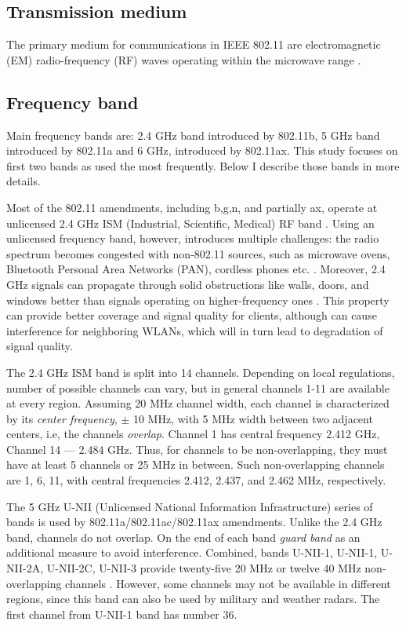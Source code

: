 \subsection{Transmission medium}

The primary medium for communications in IEEE 802.11 are electromagnetic (EM) radio-frequency (RF) waves operating within the microwave range \cite{colemanCWNACertifiedWireless2021}.

\subsection{Frequency band}
Main frequency bands are: 2.4 GHz band introduced by 802.11b, 5 GHz band introduced by 802.11a and 6 GHz, introduced by 802.11ax. This study focuses on first two bands as used the most frequently. Below I describe those bands in more details.

Most of the 802.11 amendments, including b,g,n, and partially ax, operate at unlicensed 2.4 GHz ISM (Industrial, Scientific, Medical) RF band \cite{tanenbaumComputerNetworks2020, colemanCWNACertifiedWireless2021}. Using an unlicensed frequency band, however, introduces multiple challenges: the radio spectrum becomes congested with non-802.11 sources, such as microwave ovens, Bluetooth Personal Area Networks (PAN), cordless phones etc. \cite{tanenbaumComputerNetworks2020, colemanCWNACertifiedWireless2021}. Moreover, 2.4 GHz signals can propagate through solid obstructions like walls, doors, and windows better than signals operating on higher-frequency ones \cite{colemanCWNACertifiedWireless2021}. This property can provide better coverage and signal quality for clients, although can cause interference for neighboring WLANs, which will in turn lead to degradation of signal quality.

The 2.4 GHz ISM band is split into 14 channels. Depending on local regulations, number of possible channels can vary, but in general channels 1-11 are available at every region. Assuming 20 MHz channel width, each channel is characterized by its \textit{center frequency}, $\pm$ 10 MHz, with 5 MHz width between two adjacent centers, i.e, the channels \textit{overlap}. Channel 1 has central frequency 2.412 GHz, Channel 14 — 2.484 GHz. Thus, for channels to be non-overlapping, they must have at least 5 channels or 25 MHz in between. Such non-overlapping channels are 1, 6, 11, with central frequencies 2.412, 2.437, and 2.462 MHz, respectively.

The 5 GHz U-NII (Unlicensed National Information Infrastructure) series of bands is used by 802.11a/802.11ac/802.11ax amendments. Unlike the 2.4 GHz band, channels do not overlap. On the end of each band \textit{guard band} as an additional measure to avoid interference. Combined, bands U-NII-1, U-NII-1, U-NII-2A, U-NII-2C, U-NII-3 provide twenty-five 20 MHz or twelve 40 MHz non-overlapping channels \cite{colemanCWNACertifiedWireless2021}. However, some channels may not be available in different regions, since this band can also be used by military and weather radars. The first channel from U-NII-1 band has number 36.


